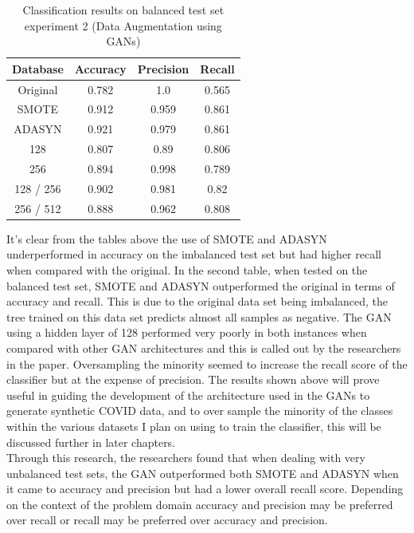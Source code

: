 \begin{table}[H]
    \centering
    \begin{tabular}{|c|c|c|c|}
         \hline
         Database
         & Accuracy
         & Precision 
         & Recall \\
         \hline
         Original & 0.782 & 1.0 & 0.565\\
         SMOTE & 0.912 & 0.959 & 0.861 \\
         ADASYN & 0.921 & 0.979 & 0.861 \\
         128 & 0.807 & 0.89 & 0.806 \\
         256 & 0.894 & 0.998 & 0.789 \\
         128 / 256 & 0.902 & 0.981 & 0.82 \\
         256 / 512 & 0.888 & 0.962 & 0.808\\
         \hline
    \end{tabular}
    \caption{Classification results on balanced test set experiment 2 (Data Augmentation using GANs)\cite{litReviewGanDataAugmentation}}
    \label{tab:Classification results on balanced test set (Data Augmentation using GANs)}
\end{table}
It's clear from the tables above the use of SMOTE and ADASYN underperformed in accuracy on the imbalanced test set but had higher recall when compared with the original.  In the second table, when tested on the balanced test set, SMOTE and ADASYN outperformed the original in terms of accuracy and recall. This is due to the original data set being imbalanced, the tree trained on this data set predicts almost all samples as negative. The GAN using a hidden layer of 128 performed very poorly in both instances when compared with other GAN architectures and this is called out by the researchers in the paper.  Oversampling the minority seemed to increase the recall score of the classifier but at the expense of precision.  The results shown above will prove useful in guiding the development of the architecture used in the GANs to generate synthetic COVID data, and to over sample the minority of the classes within the various datasets I plan on using to train the classifier, this will be discussed further in later chapters.
\\
Through this research, the researchers found that when dealing with very unbalanced test sets, the GAN outperformed both SMOTE and ADASYN when it came to accuracy and precision but had a lower overall recall score.  Depending on the context of the problem domain accuracy and precision may be preferred over recall or recall may be preferred over accuracy and precision.
